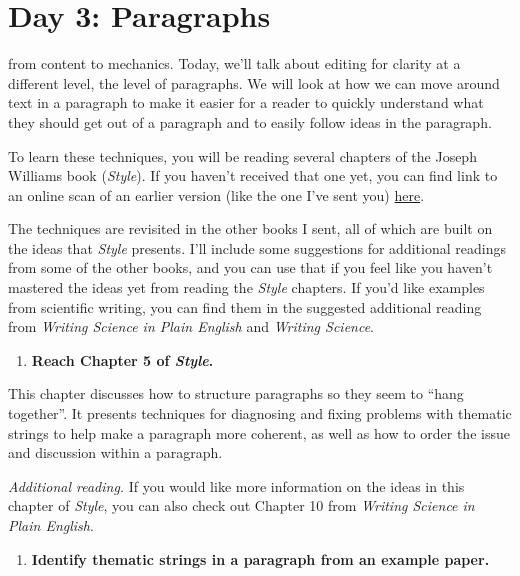 \documentclass[]{tufte-book}
\providecommand{\tightlist}{%
  \setlength{\itemsep}{0pt}\setlength{\parskip}{0pt}}
\begin{document}
\hypertarget{day-3-paragraphs}{%
\chapter{Day 3: Paragraphs}\label{day-3-paragraphs}}

 from content to mechanics. Today,
we'll talk about editing for clarity at a different level, the level of
paragraphs. We will look at how we can move around text in a paragraph to make
it easier for a reader to quickly understand what they should get out of a
paragraph and to easily follow ideas in the paragraph.

To learn these techniques, you will be reading several chapters of the Joseph
Williams book (\emph{Style}). If you haven't received that one yet, you can find link
to an online scan of an earlier version (like the one I've sent you)
\href{https://sites.duke.edu/niou/files/2014/07/WilliamsJosephM1990StyleTowardClarityandGrace.pdf}{here}.

The techniques are revisited in the other books I sent, all of which are built
on the ideas that \emph{Style} presents. I'll include some suggestions for additional
readings from some of the other books, and you can use that if you feel like you
haven't mastered the ideas yet from reading the \emph{Style} chapters. If you'd like
examples from scientific writing, you can find them in the suggested additional
reading from \emph{Writing Science in Plain English} and \emph{Writing Science}.

\begin{enumerate}
\def\labelenumi{\arabic{enumi}.}
\tightlist
\item
  \textbf{Reach Chapter 5 of \emph{Style}.}
\end{enumerate}

This chapter discusses how to structure paragraphs so they seem to ``hang
together''. It presents techniques for diagnosing and fixing problems with
thematic strings to help make a paragraph more coherent, as well as how to order
the issue and discussion within a paragraph.

\emph{Additional reading.} If you would like more information on the ideas in this
chapter of \emph{Style}, you can also check out Chapter 10 from \emph{Writing Science in
Plain English}.

\begin{enumerate}
\def\labelenumi{\arabic{enumi}.}
\setcounter{enumi}{1}
\tightlist
\item
  \textbf{Identify thematic strings in a paragraph from an example paper.}
\end{enumerate}
\end{document}
